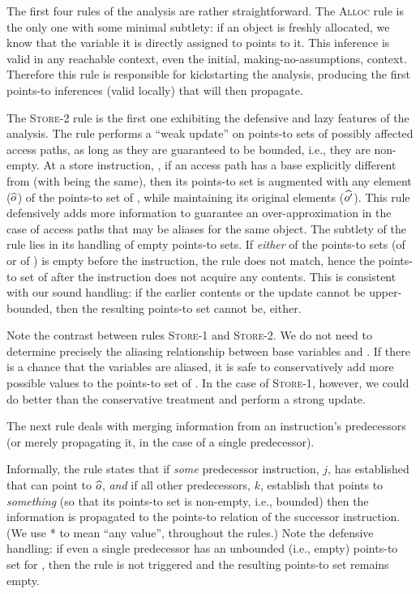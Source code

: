  The first four rules of the
analysis are rather straightforward. The \textsc{Alloc} rule is the
only one with some minimal subtlety: if an object is freshly
allocated, we know that the variable it is directly assigned to points
to it. This inference is valid in any reachable context, even the
initial, making-no-assumptions,  context. Therefore this
rule is responsible for kickstarting the analysis, producing the first
points-to inferences (valid locally) that will then propagate.

 The \textsc{Store-2} rule is the first one
exhibiting the defensive and lazy features of the analysis.  The rule
performs a ``weak update'' on points-to sets of possibly affected
access paths, as long as they are guaranteed to be bounded, i.e., they
are non-empty. At a store instruction, , if an
access path  has a base explicitly different from 
(with  being the same), then its points-to set is augmented
with any element (\({\widehat{o}}\)) of the points-to set of ,
while maintaining its original elements (\({\widehat{o'}}\)). This rule
defensively adds more information to guarantee an over-approximation
in the case of access paths that may be aliases for the same
object. The subtlety of the rule lies in its handling of empty
points-to sets. If \emph{either} of the points-to sets (of  or
of ) is empty before the instruction, the rule does not
match, hence the points-to set of  after the instruction does
not acquire any contents.  This is consistent with our sound handling:
if the earlier contents or the update cannot be upper-bounded, then
the resulting points-to set cannot be, either.

Note the contrast between rules \textsc{Store-1} and \textsc{Store-2}.
We do not need to determine precisely the aliasing relationship
between base variables  and . If there is a chance that
the variables are aliased, it is safe to conservatively add more
possible values to the points-to set of . In the case of
\textsc{Store-1}, however, we could do better than the conservative
treatment and perform a strong update.

The next rule deals with merging information from
an instruction's predecessors (or merely propagating it, in the case
of a single predecessor).

Informally, the rule states that if \emph{some} predecessor instruction,
\(j\), has established that  can point to \({\widehat{o}}\),
\emph{and} if all other predecessors, \(k\), establish that
 points to \emph{something} (so that its points-to set is
non-empty, i.e., bounded) then the information is propagated to the
points-to relation of the successor instruction. (We use * to
mean ``any value'', throughout the rules.)
Note the defensive handling: if even a single predecessor has
an unbounded (i.e., empty) points-to set for , then the
rule is not triggered and the resulting points-to set remains empty.

